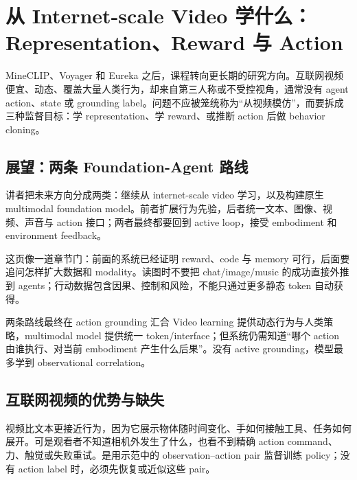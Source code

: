 \section{从 Internet-scale Video 学什么：Representation、Reward 与 Action}

MineCLIP、Voyager 和 Eureka 之后，课程转向更长期的研究方向。互联网视频便宜、动态、覆盖大量人类行为，却来自第三人称或不受控视角，通常没有 agent action、state 或 grounding label。问题不应被笼统称为“从视频模仿”，而要拆成三种监督目标：学 representation、学 reward、或推断 action 后做 behavior cloning。

\subsection{展望：两条 Foundation-Agent 路线}

讲者把未来方向分成两类：继续从 internet-scale video 学习，以及构建原生 multimodal foundation model。前者扩展行为先验，后者统一文本、图像、视频、声音与 action 接口；两者最终都要回到 active loop，接受 embodiment 和 environment feedback。


这页像一道章节门：前面的系统已经证明 reward、code 与 memory 可行，后面要追问怎样扩大数据和 modality。读图时不要把 chat/image/music 的成功直接外推到 agents；行动数据包含因果、控制和风险，不能只通过更多静态 token 自动获得。


\begin{importantbox}{两条路线最终在 action grounding 汇合}
Video learning 提供动态行为与人类策略，multimodal model 提供统一 token/interface；但系统仍需知道“哪个 action 由谁执行、对当前 embodiment 产生什么后果”。没有 active grounding，模型最多学到 observational correlation。
\end{importantbox}

\subsection{互联网视频的优势与缺失}

视频比文本更接近行为，因为它展示物体随时间变化、手如何接触工具、任务如何展开。可是观看者不知道相机外发生了什么，也看不到精确 action command、力、触觉或失败重试。是用示范中的 observation--action pair 监督训练 policy；没有 action label 时，必须先恢复或近似这些 pair。

